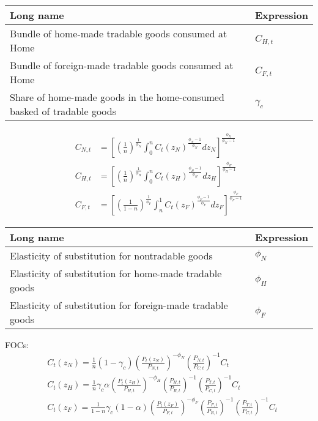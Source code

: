 \begin{table}[ht]
    \begin{tabular}{ll}
        \textbf{Long name}                                                     & \textbf{Expression} \\ \hline \hline
        Bundle of home-made tradable goods consumed at Home                    & $C_{H, t}$          \\
        Bundle of foreign-made tradable goods consumed at Home                 & $C_{F, t}$          \\
        Share of home-made goods in the home-consumed basked of tradable goods & $\gamma_c$
    \end{tabular}
\end{table}

\begin{align}
    C_{N, t} & =\left[\left(\frac{1}{n}\right)^{\frac{1}{\phi_N}} \int_0^n C_t\left(z_N\right)^{\frac{\phi_N-1}{\phi_N}} d z_N\right]^{\frac{\phi_N}{\phi_N-1}}   \\
    C_{H, t} & =\left[\left(\frac{1}{n}\right)^{\frac{1}{\phi_H}} \int_0^n C_t\left(z_H\right)^{\frac{\phi_H-1}{\phi_H}} d z_H\right]^{\frac{\phi_H}{\phi_H-1}}   \\
    C_{F, t} & =\left[\left(\frac{1}{1-n}\right)^{\frac{1}{\phi_F}} \int_n^1 C_t\left(z_F\right)^{\frac{\phi_F-1}{\phi_F}} d z_F\right]^{\frac{\phi_F}{\phi_F-1}}
\end{align}

\begin{table}[ht]
    \begin{tabular}{ll}
        \textbf{Long name}                                         & \textbf{Expression} \\ \hline \hline
        Elasticity of substitution for nontradable goods           & $\phi_{N}$          \\
        Elasticity of substitution for home-made tradable goods    & $\phi_{H}$          \\
        Elasticity of substitution for foreign-made tradable goods & $\phi_{F}$          \\
    \end{tabular}
\end{table}

FOCs:
\begin{align}
     & C_t\left(z_N\right)=\frac{1}{n}\left(1-\gamma_c\right)\left(\frac{P_t\left(z_N\right)}{P_{N, t}}\right)^{-\phi_N}\left(\frac{P_{N, t}}{P_{C, t}}\right)^{-1} C_t                                          \\
     & C_t\left(z_H\right)=\frac{1}{n} \gamma_c \alpha\left(\frac{P_t\left(z_H\right)}{P_{H, t}}\right)^{-\phi_H}\left(\frac{P_{H, t}}{P_{R, t}}\right)^{-1}\left(\frac{P_{T, t}}{P_{C, t}}\right)^{-1} C_t      \\
     & C_t\left(z_F\right)=\frac{1}{1-n} \gamma_c(1-\alpha)\left(\frac{P_t\left(z_F\right)}{P_{F, t}}\right)^{-\phi_F}\left(\frac{P_{F, t}}{P_{R, t}}\right)^{-1}\left(\frac{P_{T, t}}{P_{C, t}}\right)^{-1} C_t
\end{align}

